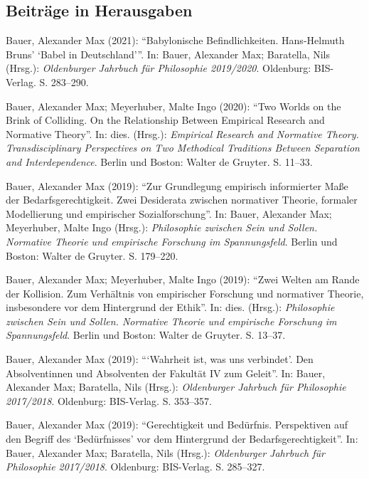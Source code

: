 \documentclass[a4paper,10pt]{article}
\newenvironment{literature}{%
   \parskip6pt\parindent0pt\raggedright
   \def\lititem{\hangindent=1cm\hangafter1}}{%
   \par\ignorespaces}
\begin{document}
\subsection*{Beiträge in Herausgaben}
\begin{literature}
\lititem Bauer, Alexander Max (2021): \enquote{Babylonische Befindlichkeiten. Hans-Helmuth Bruns' \enquote{Babel in Deutschland}}. In: Bauer, Alexander Max; Baratella, Nils (Hrsg.): \textit{Oldenburger Jahrbuch für Philosophie 2019/2020}. Oldenburg: BIS-Verlag. S. 283--290.

\lititem Bauer, Alexander Max; Meyerhuber, Malte Ingo (2020): \enquote{Two Worlds on the Brink of Colliding. On the Relationship Between Empirical Research and Normative Theory}. In: dies. (Hrsg.): \textit{Empirical Research and Normative Theory. Transdisciplinary Perspectives on Two Methodical Traditions Between Separation and Interdependence}. Berlin und Boston: Walter de Gruyter. S. 11--33.

\lititem Bauer, Alexander Max (2019): \enquote{Zur Grundlegung empirisch informierter Maße der Bedarfsgerechtigkeit. Zwei Desiderata zwischen normativer Theorie, formaler Modellierung und empirischer Sozialforschung}. In: Bauer, Alexander Max; Meyerhuber, Malte Ingo (Hrsg.): \textit{Philosophie zwischen Sein und Sollen. Normative Theorie und empirische Forschung im Spannungsfeld}. Berlin und Boston: Walter de Gruyter. S. 179--220.

\lititem Bauer, Alexander Max; Meyerhuber, Malte Ingo (2019): \enquote{Zwei Welten am Rande der Kollision. Zum Verhältnis von empirischer Forschung und normativer Theorie, insbesondere vor dem Hintergrund der Ethik}. In: dies. (Hrsg.): \textit{Philosophie zwischen Sein und Sollen. Normative Theorie und empirische Forschung im Spannungsfeld}. Berlin und Boston: Walter de Gruyter. S. 13--37.

\lititem Bauer, Alexander Max (2019): \enquote{\enquote{Wahrheit ist, was uns verbindet}. Den Absolventinnen und Absolventen der Fakultät IV zum Geleit}. In: Bauer, Alexander Max; Baratella, Nils (Hrsg.): \textit{Oldenburger Jahrbuch für Philosophie 2017/2018}. Oldenburg: BIS-Verlag. S. 353--357.

\lititem Bauer, Alexander Max (2019): \enquote{Gerechtigkeit und Bedürfnis. Perspektiven auf den Begriff des \enquote{Bedürfnisses} vor dem Hintergrund der Bedarfsgerechtigkeit}. In: Bauer, Alexander Max; Baratella, Nils (Hrsg.): \textit{Oldenburger Jahrbuch für Philosophie 2017/2018}. Oldenburg: BIS-Verlag. S. 285--327.
\end{literature}
\end{document}
